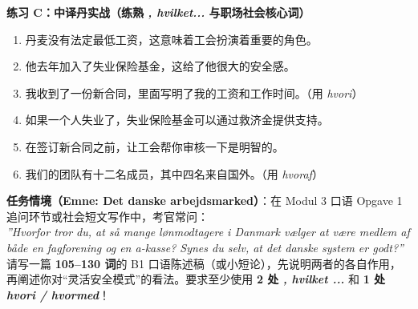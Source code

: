 \textbf{练习 C：中译丹实战（练熟 \textit{, hvilket...} 与职场社会核心词）}
\begin{enumerate}
  \item 丹麦没有法定最低工资，这意味着工会扮演着重要的角色。
  \item 他去年加入了失业保险基金，这给了他很大的安全感。
  \item 我收到了一份新合同，里面写明了我的工资和工作时间。（用 \textit{hvori}）
  \item 如果一个人失业了，失业保险基金可以通过救济金提供支持。
  \item 在签订新合同之前，让工会帮你审核一下是明智的。
  \item 我们的团队有十二名成员，其中四名来自国外。（用 \textit{hvoraf}）
\end{enumerate}


\begin{tcolorbox}[enhanced, breakable, colback=NCDBgGray, colframe=NCDGray, coltitle=white, fonttitle=\bfseries, title={DU3 Modul 3 实战微任务（对标 Mundtlig Opgave 1 观点陈述 / 书面短论 · 100+ 词）}, arc=2pt, boxrule=0.8pt, borderline west={3pt}{0pt}{NCDRed}, left=10pt, right=10pt, top=7pt, bottom=7pt]
\small
\textbf{任务情境（Emne: Det danske arbejdsmarked）}：在 Modul 3 口语 Opgave 1 追问环节或社会短文写作中，考官常问：\\
\textit{”Hvorfor tror du, at så mange lønmodtagere i Danmark vælger at være medlem af både en fagforening og en a-kasse? Synes du selv, at det danske system er godt?”}\\[4pt]
请写一篇 \textbf{105--130 词}的 B1 口语陈述稿（或小短论），先说明两者的各自作用，再阐述你对“灵活安全模式”的看法。要求至少使用 \textbf{2 处 \textit{, hvilket ...}} 和 \textbf{1 处 \textit{hvori / hvormed}}！
\end{tcolorbox}

